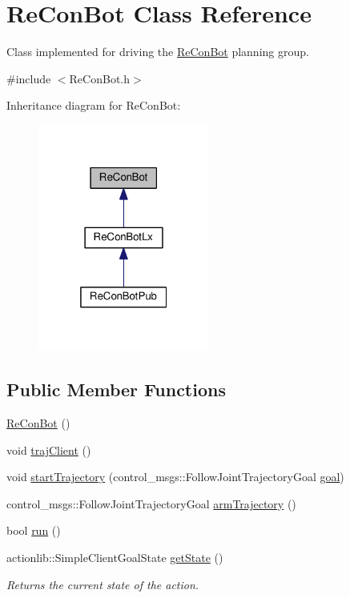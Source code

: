 \hypertarget{class_re_con_bot}{}\section{Re\+Con\+Bot Class Reference}
\label{class_re_con_bot}


Class implemented for driving the \hyperlink{class_re_con_bot}{Re\+Con\+Bot} planning group.  




{\ttfamily \#include $<$Re\+Con\+Bot.\+h$>$}



Inheritance diagram for Re\+Con\+Bot\+:\nopagebreak
\begin{figure}[H]
\begin{center}
\leavevmode
\includegraphics[width=160pt]{d5/d0d/class_re_con_bot__inherit__graph}
\end{center}
\end{figure}
\subsection*{Public Member Functions}
\begin{DoxyCompactItemize}
\item 
\hyperlink{class_re_con_bot_a3c0174965242ba69f252e09d18ce2e98}{Re\+Con\+Bot} ()
\item 
void \hyperlink{class_re_con_bot_ab859fa96532995d3c1545aaa9db1802e}{traj\+Client} ()
\item 
void \hyperlink{class_re_con_bot_ade3eb1a4752d45659321209f5730cef3}{start\+Trajectory} (control\+\_\+msgs\+::\+Follow\+Joint\+Trajectory\+Goal \hyperlink{class_re_con_bot_a9bd1c7ddf2376e2e68ea5d8bd8c3f505}{goal})
\item 
control\+\_\+msgs\+::\+Follow\+Joint\+Trajectory\+Goal \hyperlink{class_re_con_bot_a950f2769ca61ff7b663d86ed2cf19c14}{arm\+Trajectory} ()
\item 
bool \hyperlink{class_re_con_bot_ac264f3082203c3b2ef13b6f353476ca7}{run} ()
\item 
actionlib\+::\+Simple\+Client\+Goal\+State \hyperlink{class_re_con_bot_a3d9656755c06ded1f3b88ce05565f758}{get\+State} ()
\begin{DoxyCompactList}\small\item\em Returns the current state of the action. \end{DoxyCompactList}\end{DoxyCompactItemize}
